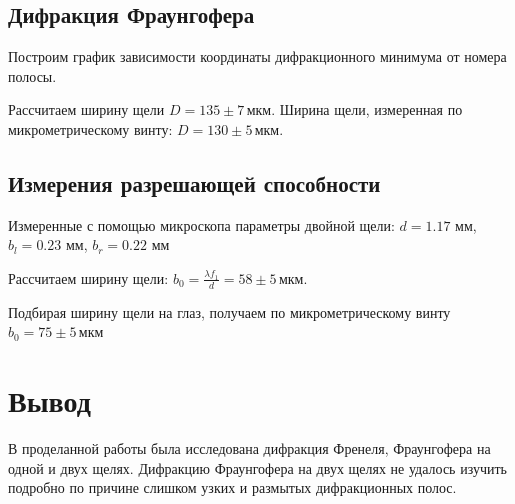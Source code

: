 \documentclass[a4paper,12pt]{article}
\begin{document}
		
		
		\newpage
		
		\subsection{Дифракция Фраунгофера}
			Построим график зависимости координаты дифракционного минимума от номера полосы.
			
		Рассчитаем ширину щели $D = 135 \pm 7\,\text{мкм}$. Ширина щели, измеренная по микрометрическому винту: $D = 130 \pm 5 \,\text{мкм}$.
		
		\subsection{Измерения разрешающей способности}
		
		Измеренные с помощью микроскопа параметры двойной щели: $d=1.17$ мм, $b_l=0.23$ мм, $b_r=0.22$ мм
		
		Рассчитаем ширину щели: $b_0=\frac{\lambda f_1}{d}=58\pm 5\,\text{мкм}$.
		
		Подбирая ширину щели на глаз, получаем по микрометрическому винту $b_0 = 75 \pm 5 \,\text{мкм}$
		
		\section{Вывод}
		В проделанной работы была исследована дифракция Френеля, Фраунгофера на одной и двух щелях. Дифракцию Фраунгофера на двух щелях не удалось изучить подробно по причине слишком узких и размытых дифракционных полос.
\end{document}
